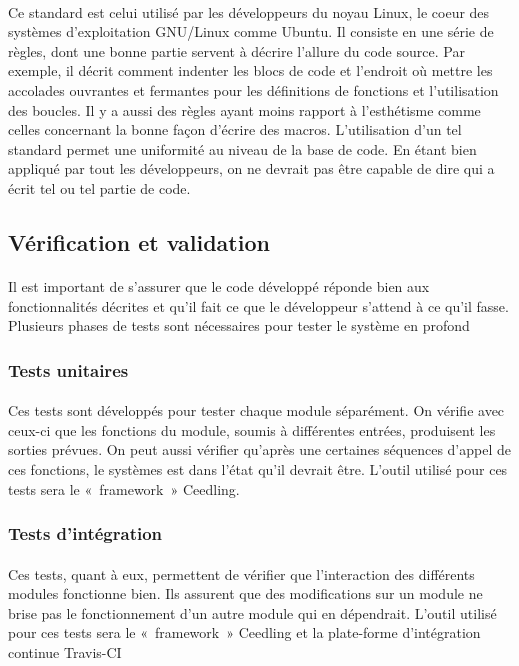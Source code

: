 		\paragraph{}
		Ce standard est celui utilisé par les développeurs du noyau Linux, le coeur des systèmes d’exploitation GNU/Linux comme Ubuntu. Il consiste en une série de règles, dont une bonne partie servent à décrire l’allure du code source. Par exemple, il décrit comment indenter les blocs de code et l’endroit où mettre les accolades ouvrantes et fermantes pour les définitions de fonctions et l’utilisation des boucles. Il y a aussi des règles ayant moins rapport à l’esthétisme comme celles concernant la bonne façon d’écrire des macros. L’utilisation d’un tel standard permet une uniformité au niveau de la base de code. En étant bien appliqué par tout les développeurs, on ne devrait pas être capable de dire qui a écrit tel ou tel partie de code.

	\subsection{Vérification et validation}
	\paragraph{}
	Il est important de s’assurer que le code développé réponde bien aux fonctionnalités décrites et qu’il fait ce que le développeur s’attend à ce qu’il fasse. Plusieurs phases de tests sont nécessaires pour tester le système en profond

		\subsubsection{Tests unitaires}
		\paragraph{}
		Ces tests sont développés pour tester chaque module séparément. On vérifie avec ceux-ci que les fonctions du module, soumis à différentes entrées, produisent les sorties prévues. On peut aussi vérifier qu’après une certaines séquences d’appel de ces fonctions, le systèmes est dans l’état qu’il devrait être. L’outil utilisé pour ces tests sera le « framework » Ceedling.

		\subsubsection{Tests d'intégration}
		\paragraph{}
		Ces tests, quant à eux, permettent de vérifier que l’interaction des différents modules fonctionne bien. Ils assurent que des modifications sur un module ne brise pas le fonctionnement d’un autre module qui en dépendrait. L’outil utilisé pour ces tests sera le « framework » Ceedling et la  plate-forme d’intégration continue Travis-CI

